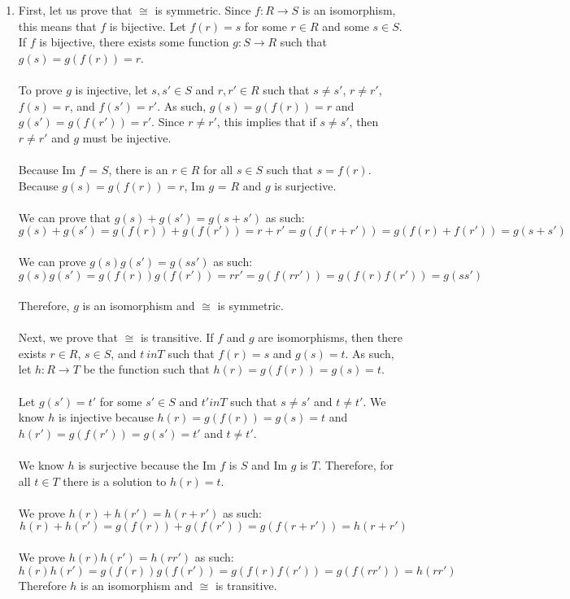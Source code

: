 \documentclass{article}
\begin{document}
\begin{enumerate}
\item First, let us prove that $\cong$ is symmetric.
Since $f: R \rightarrow S$ is an isomorphism, this means that $f$ is bijective.
Let $f(r) = s$ for some $r \in R$ and some $s \in S$.
If $f$ is bijective, there exists some function $g: S \rightarrow R$ such that
$g(s) = g(f(r)) = r$. \\ \\
To prove $g$ is injective, let $s, s' \in S$ and $r, r' \in R$ such that
$s \neq s'$, $r \neq r'$, $f(s) = r$, and $f(s') = r'$.  As such,
$g(s) = g(f(r)) = r$ and $g(s') = g(f(r')) = r'$.  Since $r \neq r'$, this
implies that if $s \neq s'$, then $r \neq r'$ and $g$ must be injective. \\ \\
Because Im $f$ = $S$, there is an $r \in R$ for all $s \in S$ such that
$s = f(r)$.  Because $g(s) = g(f(r)) = r$, Im $g$ = $R$ and $g$ is surjective. \\ \\
We can prove that $g(s) + g(s') = g(s + s')$ as such: \\
\[
g(s) + g(s') = g(f(r)) + g(f(r')) = r + r' = g(f(r + r')) = g(f(r) + f(r')) = g(s + s')
\]
\\
We can prove $g(s)g(s') = g(ss')$ as such:
\[
g(s)g(s') = g(f(r))g(f(r')) = rr' = g(f(rr')) = g(f(r)f(r')) = g(ss')
\]
\\
Therefore, $g$ is an isomorphism and $\cong$ is symmetric.
\\ \\
Next, we prove that $\cong$ is transitive.  If $f$ and $g$ are isomorphisms,
then there exists $r \in R$, $s \in S$, and $t \ in T$ such that
$f(r) = s$ and $g(s) = t$.  As such, let $h: R \rightarrow T$ be the function
such that $h(r) = g(f(r)) = g(s) = t$. \\ \\
Let $g(s') = t'$ for some $s' \in S$ and $t' in T$ such that
$s \neq s'$ and $t \neq t'$.
We know $h$ is injective because $h(r) = g(f(r)) = g(s) = t$ and
$h(r') = g(f(r')) = g(s') = t'$ and $t \neq t'$.
\\ \\
We know $h$ is surjective because the Im $f$ is $S$ and Im $g$ is $T$.
Therefore, for all $t \in T$ there is a solution to $h(r) = t$.
\\ \\
We prove $h(r) + h(r') = h(r + r')$ as such:
\[
h(r) + h(r') = g(f(r)) + g(f(r')) = g(f(r + r')) = h(r + r')
\]
\\
We prove $h(r)h(r') = h(rr')$ as such:
\[
h(r)h(r') = g(f(r))g(f(r')) = g(f(r)f(r')) = g(f(rr')) = h(rr')
\]
Therefore $h$ is an isomorphism and $\cong$ is transitive.


\end{enumerate}
\end{document}
